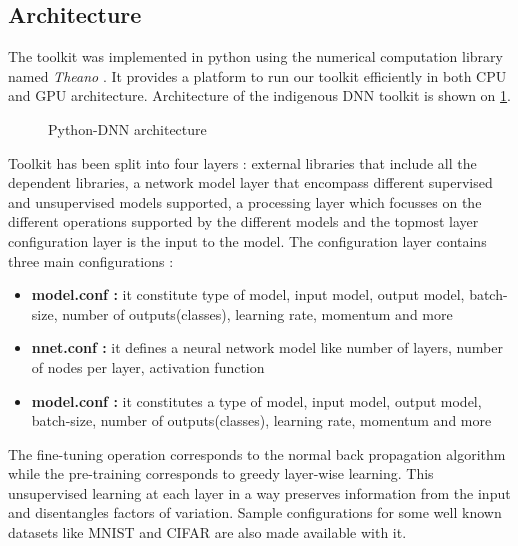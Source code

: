 \subsection{Architecture}
The toolkit was implemented in python using the numerical computation library named \textit{Theano} \citep{theano}.  It provides a platform to run our toolkit efficiently in both CPU and GPU architecture.  Architecture of the indigenous DNN toolkit is shown on \ref{fig:architecture}.
\begin{figure}[htpb]
   \begin{center}
   		{%
			\setlength{\fboxsep}{5pt}%
	    }%
     \caption {Python-DNN architecture}
	 \label{fig:architecture}
   \end{center}
 \end{figure}
Toolkit has been split into four layers : external libraries that include all the dependent libraries, a network model layer that encompass different supervised and unsupervised models supported, a processing layer which focusses on the different operations supported by the different models and the topmost layer configuration layer is the input to the model.  The configuration layer contains three main configurations : 
 \begin{itemize}
	\item {\textbf{model.conf :} it constitute type of model, input model, output model, batch-size, number of outputs(classes), learning rate, momentum and more}
	\item {\textbf{nnet.conf :} it defines a neural network model like number of layers, number of nodes per layer, activation function}
	\item {\textbf{model.conf :} it constitutes a type of model, input model, output model, batch-size, number of outputs(classes), learning rate, momentum and more}
 \end{itemize}
The fine-tuning operation corresponds to the normal back propagation algorithm while the pre-training corresponds to greedy layer-wise learning.  This unsupervised learning at each layer in a way preserves information from the input and disentangles factors of variation.  Sample configurations for some well known datasets like MNIST and CIFAR are also made available with it.
